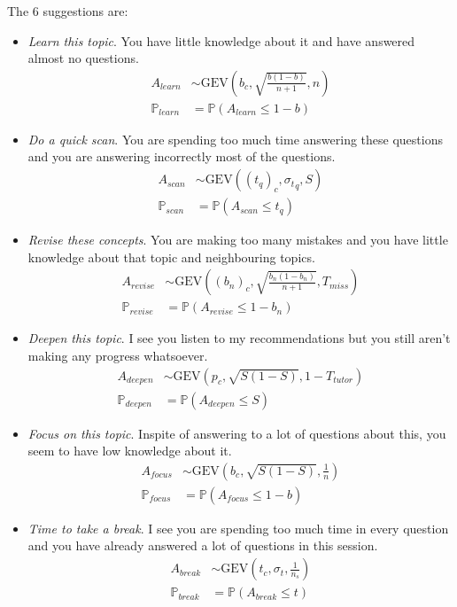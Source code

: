 \documentclass{article}
\newcommand{\0}{\mathbbold{0}}
\newcommand{\1}{\mathds{1}}
\newcommand{\2}{\mathbbold{2}}
\newcommand{\GEV}[3]{\text{GEV}\!\left(#1,#2,#3\right)}
\begin{document}
The $6$ suggestions are:
\begin{itemize}
    \item \textsl{Learn this topic}. You have little knowledge about it and have answered almost no questions.
    \begin{align*}
        A_\mathit{learn} &\sim \GEV{b_c}{\sqrt{\frac{b(1-b)}{n+1}}}{n} \\
        \mathbb{P}_\mathit{learn} &= \mathbb{P}\left(A_\mathit{learn} \le 1 - b\right)
    \end{align*}
    \item \textsl{Do a quick scan}. You are spending too much time answering these questions and you are answering incorrectly most of the questions.
    \begin{align*}
        A_\mathit{scan} &\sim \GEV{(t_q)_c}{{\sigma_t}_q}{S} \\
        \mathbb{P}_\mathit{scan} &= \mathbb{P}\left(A_\mathit{scan} \le t_q\right)
    \end{align*}
    \item \textsl{Revise these concepts}. You are making too many mistakes and you have little knowledge about that topic and neighbouring topics.
    \begin{align*}
        A_\mathit{revise} &\sim \GEV{(b_n)_c}{\sqrt{\frac{b_n(1-b_n)}{n+1}}}{T_\mathit{miss}} \\
        \mathbb{P}_\mathit{revise} &= \mathbb{P}\left(A_\mathit{revise} \le 1 - b_n\right)
    \end{align*}
    \item \textsl{Deepen this topic}. I see you listen to my recommendations but you still aren't making any progress whatsoever.
    \begin{align*}
        A_\mathit{deepen} &\sim \GEV{p_c}{\sqrt{S(1-S)}}{1-T_\mathit{tutor}} \\
        \mathbb{P}_\mathit{deepen} &= \mathbb{P}\left(A_\mathit{deepen} \le S\right)
    \end{align*}
    \item \textsl{Focus on this topic}. Inspite of answering to a lot of questions about this, you seem to have low knowledge about it.
    \begin{align*}
        A_\mathit{focus} &\sim \GEV{b_c}{\sqrt{S(1-S)}}{\frac{1}{n}} \\
        \mathbb{P}_\mathit{focus} &= \mathbb{P}\left(A_\mathit{focus} \le 1 - b\right)
    \end{align*}
    \item \textsl{Time to take a break}. I see you are spending too much time in every question and you have already answered a lot of questions in this session.
    \begin{align*}
        A_\mathit{break} &\sim \GEV{t_c}{\sigma_t}{\frac{1}{n_s}} \\
        \mathbb{P}_\mathit{break} &= \mathbb{P}\left(A_\mathit{break} \le t\right)
    \end{align*}
\end{itemize}
\end{document}
